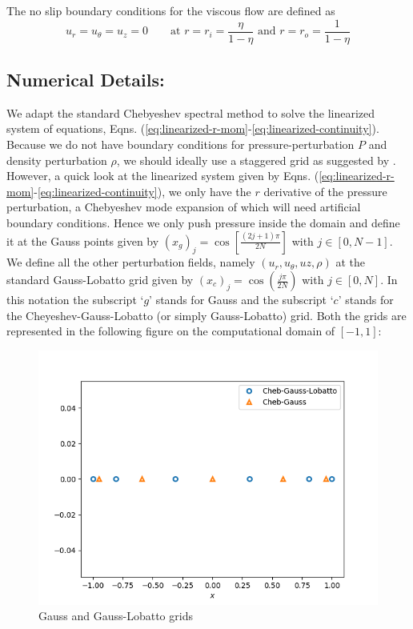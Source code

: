 \documentclass{article}
\begin{document}
The no slip boundary conditions for the viscous flow are defined as 
\begin{equation}
 u_{r} = u_{\theta} = u_{z} = 0 
 \qquad
 \textrm{at } r = r_{i} = \frac{\eta}{1-\eta} \textrm{ and } r = r_{o} = \frac{1}{1-\eta} 
\end{equation}
\subsection*{Numerical Details:}
We adapt the standard Chebyeshev spectral method to solve the linearized system of equations, Eqns. (\ref{eq:linearized-r-mom}-\ref{eq:linearized-continuity}). Because we do not have boundary conditions for pressure-perturbation $P$ and density perturbation $\rho$, we should ideally use a staggered grid as suggested by \cite{khorrami1991chebyshev}. However, a quick look at the linearized system given by Eqns. (\ref{eq:linearized-r-mom}-\ref{eq:linearized-continuity}), we only have the $r$ derivative of the pressure perturbation, a Chebyeshev mode expansion of which will need artificial boundary conditions. Hence we only push pressure inside the domain and define it at the Gauss points given by $(x_{g})_{j} = \cos{\left[\frac{(2j + 1)\pi}{2N}\right]}$ with $j \in [0, N-1]$. We define all the other perturbation fields, namely $(u_{r}, u_{\theta}, uz, \rho)$ at the standard Gauss-Lobatto grid given by $(x_{c})_{j} = \cos{\left(\frac{j\pi}{2N}\right)}$ with $j \in [0, N]$. In this notation the subscript `$g$' stands for Gauss and the subscript `$c$' stands for the Cheyeshev-Gauss-Lobatto (or simply Gauss-Lobatto) grid. 
Both the grids are represented in the following figure on the computational domain of $[-1, 1]$:

\begin{figure}[H]
        \centering
    \includegraphics[scale=0.35]{Figs/test_gauss_grid.png}
            \caption{Gauss and Gauss-Lobatto grids}
        \label{fig:grids}
\end{figure}
\end{document}
